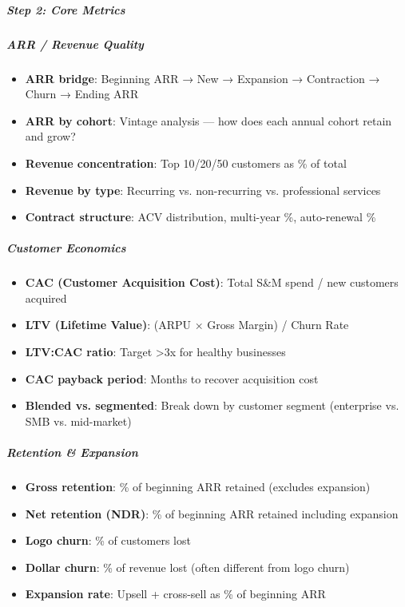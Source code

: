 \documentclass[11pt]{article}
\begin{document}
\subparagraph{Step 2: Core Metrics}\mbox{}\par

\subparagraph{ARR / Revenue Quality}\mbox{}\par
\begin{itemize}[leftmargin=*,itemsep=2pt,topsep=2pt]
\item {} \textbf{ARR bridge}: Beginning ARR → New → Expansion → Contraction → Churn → Ending ARR
\item {} \textbf{ARR by cohort}: Vintage analysis — how does each annual cohort retain and grow?
\item {} \textbf{Revenue concentration}: Top 10/20/50 customers as \% of total
\item {} \textbf{Revenue by type}: Recurring vs. non-recurring vs. professional services
\item {} \textbf{Contract structure}: ACV distribution, multi-year \%, auto-renewal \%
\end{itemize}

\subparagraph{Customer Economics}\mbox{}\par
\begin{itemize}[leftmargin=*,itemsep=2pt,topsep=2pt]
\item {} \textbf{CAC (Customer Acquisition Cost)}: Total S\&M spend / new customers acquired
\item {} \textbf{LTV (Lifetime Value)}: (ARPU × Gross Margin) / Churn Rate
\item {} \textbf{LTV:CAC ratio}: Target >3x for healthy businesses
\item {} \textbf{CAC payback period}: Months to recover acquisition cost
\item {} \textbf{Blended vs. segmented}: Break down by customer segment (enterprise vs. SMB vs. mid-market)
\end{itemize}

\subparagraph{Retention \& Expansion}\mbox{}\par
\begin{itemize}[leftmargin=*,itemsep=2pt,topsep=2pt]
\item {} \textbf{Gross retention}: \% of beginning ARR retained (excludes expansion)
\item {} \textbf{Net retention (NDR)}: \% of beginning ARR retained including expansion
\item {} \textbf{Logo churn}: \% of customers lost
\item {} \textbf{Dollar churn}: \% of revenue lost (often different from logo churn)
\item {} \textbf{Expansion rate}: Upsell + cross-sell as \% of beginning ARR
\end{itemize}
\end{document}

